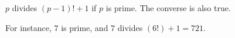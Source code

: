 $p$ divides $(p-1)!+1$ if $p$ is prime. The converse is also true.
\par
For instance, $7$ is prime, and  $7$ divides $(6!)+1 = 721$.